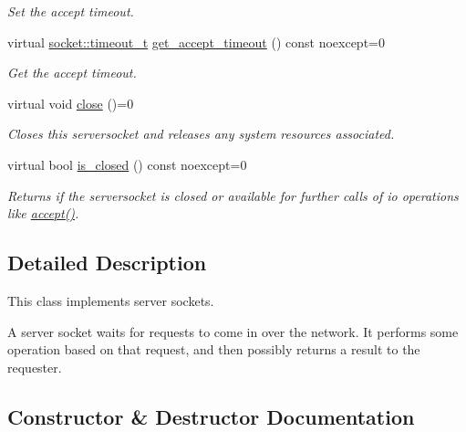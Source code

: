\begin{DoxyCompactItemize}
\begin{DoxyCompactList}\small\item\em Set the accept timeout. \end{DoxyCompactList}\item 
virtual \hyperlink{structdevfix_1_1net_1_1socket_a80a3bf4cb7292bae31ea9c6575539c68}{socket\+::timeout\+\_\+t} \hyperlink{structdevfix_1_1net_1_1serversocket_acde0979277bf9536f54bb0fb6a9cc881}{get\+\_\+accept\+\_\+timeout} () const noexcept=0
\begin{DoxyCompactList}\small\item\em Get the accept timeout. \end{DoxyCompactList}\item 
virtual void \hyperlink{structdevfix_1_1net_1_1serversocket_ab1762c3364c8298dbac6c3dd67a1e7aa}{close} ()=0
\begin{DoxyCompactList}\small\item\em Closes this {\itshape serversocket} and releases any system resources associated. \end{DoxyCompactList}\item 
virtual bool \hyperlink{structdevfix_1_1net_1_1serversocket_a37cc4e3ecede2a0bc52f90e49fcbe4a9}{is\+\_\+closed} () const noexcept=0
\begin{DoxyCompactList}\small\item\em Returns if the {\itshape serversocket} is closed or available for further calls of io operations like \hyperlink{structdevfix_1_1net_1_1serversocket_a7b3ea6aad486060acdd1385a08f7db81}{accept()}. \end{DoxyCompactList}\end{DoxyCompactItemize}


\subsection{Detailed Description}
This class implements server sockets. 

A server socket waits for requests to come in over the network. It performs some operation based on that request, and then possibly returns a result to the requester. 

\subsection{Constructor \& Destructor Documentation}
\mbox{\label{structdevfix_1_1net_1_1serversocket_afd9f315c4018808c790478710f52d8ab}} 
